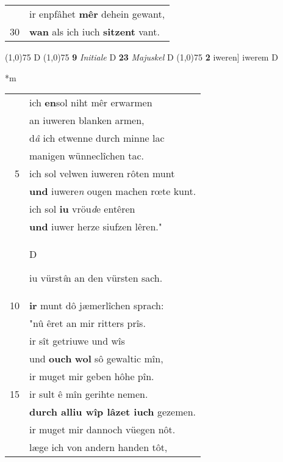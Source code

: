 \documentclass[8pt,a4paper,notitlepage]{article}
\begin{document}
\begin{table}[ht]
\begin{minipage}[t]{0.5\linewidth}
\begin{tabular}{rl}
 & ir enpfâhet \textbf{mêr} dehein gewant,\\ 
30 & \textbf{wan} als ich iuch \textbf{sitzent} vant.\\ 
\end{tabular}
\scriptsize
\line(1,0){75} \newline
D \newline
\line(1,0){75} \newline
\textbf{9} \textit{Initiale} D  \textbf{23} \textit{Majuskel} D  \newline
\line(1,0){75} \newline
\textbf{2} iweren] iwerem D \newline
\end{minipage}
\hspace{0.5cm}
\begin{minipage}[t]{0.5\linewidth}
\small
\begin{center}*m
\end{center}
\begin{tabular}{rl}
 & ich \textbf{en}sol niht mêr erwarmen\\ 
 & an iuweren blanken armen,\\ 
 & d\textit{â} ich etwenne durch minne lac\\ 
 & manigen wünneclîchen tac.\\ 
5 & ich sol velwen iuweren rôten munt\\ 
 & \textbf{und} iuwere\textit{n} ougen machen rœte kunt.\\ 
 & ich sol \textbf{iu} vröu\textit{d}e entêren\\ 
 & \textbf{und} iuwer herze siufzen lêren."\\ 
 & \begin{large}D\end{large}iu vürst\textit{î}n an den vürsten sach.\\ 
10 & \textbf{ir} munt dô jæmerlîchen sprach:\\ 
 & "nû êret an mir ritters prîs.\\ 
 & ir sît getriuwe und wîs\\ 
 & und \textbf{ouch} \textbf{wol} sô gewaltic mîn,\\ 
 & ir muget mir geben hôhe pîn.\\ 
15 & ir sult ê mîn gerihte nemen.\\ 
 & \textbf{durch alliu wîp lâzet iuch} gezemen.\\ 
 & ir muget mir dannoch vüegen nôt.\\ 
 & læge ich von andern handen tôt,\\ 

\end{tabular}
\end{minipage}
\end{table}
\end{document}

